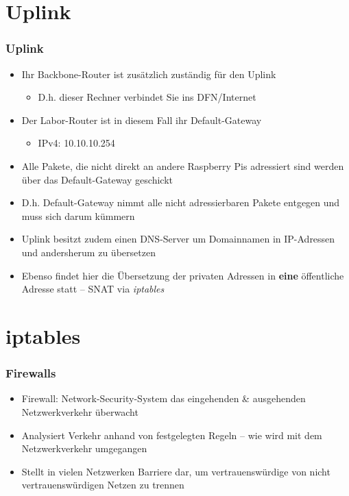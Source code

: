 \documentclass[xcolor=dvipsnames, aspectratio=169]{beamer}
\begin{document}
\section{Uplink}
\begin{frame}
\frametitle{Uplink}
	\begin{itemize}
		\item Ihr Backbone-Router ist zusätzlich zuständig für den Uplink
		\begin{itemize}
			\item D.h. dieser Rechner verbindet Sie ins DFN/Internet
		\end{itemize}
		\item Der Labor-Router ist in diesem Fall ihr Default-Gateway
		\begin{itemize}
			\item IPv4: 10.10.10.254
		\end{itemize}
		\item Alle Pakete, die nicht direkt an andere Raspberry Pis adressiert sind werden über das Default-Gateway geschickt
		\item D.h. Default-Gateway nimmt alle nicht adressierbaren Pakete entgegen und muss sich darum kümmern
		\item Uplink besitzt zudem einen DNS-Server um Domainnamen in IP-Adressen und andersherum zu übersetzen
		\item Ebenso findet hier die Übersetzung der privaten Adressen in \textbf{eine} öffentliche Adresse statt -- SNAT via \emph{iptables}
	\end{itemize}
\end{frame}

\section{iptables}
\begin{frame}
\frametitle{Firewalls}
	\begin{itemize}
		\item Firewall: Network-Security-System das eingehenden \& ausgehenden Netzwerkverkehr überwacht
		\item Analysiert Verkehr anhand von festgelegten Regeln -- wie wird mit dem Netzwerkverkehr umgegangen
		\item Stellt in vielen Netzwerken Barriere dar, um vertrauenswürdige von nicht vertrauenswürdigen Netzen zu trennen
	\end{itemize}
\end{frame}
\end{document}
